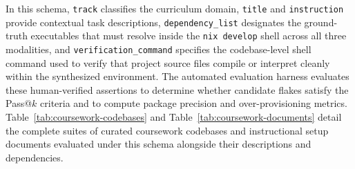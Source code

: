 In this schema, \texttt{track} classifies the curriculum domain, \texttt{title} and
\texttt{instruction} provide contextual task descriptions, \texttt{dependency\_list}
designates the ground-truth executables that must resolve inside the \texttt{nix
	develop} shell across all three modalities, and \texttt{verification\_command} specifies
the codebase-level shell command used to verify that project source files compile
or interpret cleanly within the synthesized environment. The automated
evaluation harness evaluates these human-verified assertions to determine
whether candidate flakes satisfy the Pass@$k$ criteria and to compute package precision
and over-provisioning metrics. Table~\ref{tab:coursework-codebases} and Table~\ref{tab:coursework-documents}
detail the complete suites of curated coursework codebases and instructional
setup documents evaluated under this schema alongside their descriptions and
dependencies.

